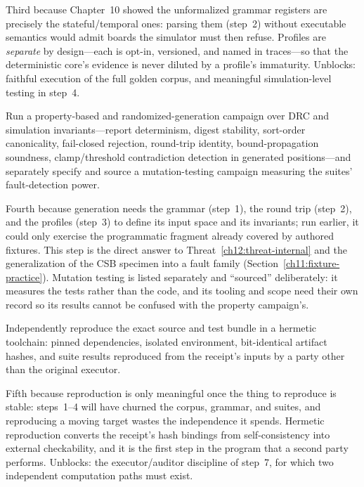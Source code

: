 Third because Chapter~10 showed the unformalized grammar registers are precisely the stateful/temporal ones: parsing them (step~2) without executable semantics would admit boards the simulator must then refuse. Profiles are \emph{separate} by design---each is opt-in, versioned, and named in traces---so that the deterministic core's evidence is never diluted by a profile's immaturity. Unblocks: faithful execution of the full golden corpus, and meaningful simulation-level testing in step~4.

\begin{protocol}\label{ch12:step4}
Run a property-based and randomized-generation campaign \cite{quickcheck} over DRC and simulation invariants---report determinism, digest stability, sort-order canonicality, fail-closed rejection, round-trip identity, bound-propagation soundness, clamp/threshold contradiction detection in generated positions---and separately specify and source a mutation-testing campaign measuring the suites' fault-detection power.
\end{protocol}

Fourth because generation needs the grammar (step~1), the round trip (step~2), and the profiles (step~3) to define its input space and its invariants; run earlier, it could only exercise the programmatic fragment already covered by authored fixtures. This step is the direct answer to Threat~\ref{ch12:threat-internal} and the generalization of the CSB specimen into a fault family (Section~\ref{ch11:fixture-practice}). Mutation testing is listed separately and ``sourced'' deliberately: it measures the tests rather than the code, and its tooling and scope need their own record so its results cannot be confused with the property campaign's.

\begin{protocol}\label{ch12:step5}
Independently reproduce the exact source and test bundle in a hermetic toolchain: pinned dependencies, isolated environment, bit-identical artifact hashes, and suite results reproduced from the receipt's inputs by a party other than the original executor.
\end{protocol}

Fifth because reproduction is only meaningful once the thing to reproduce is stable: steps~1--4 will have churned the corpus, grammar, and suites, and reproducing a moving target wastes the independence it spends. Hermetic reproduction converts the receipt's hash bindings from self-consistency into external checkability, and it is the first step in the program that a second party performs. Unblocks: the executor/auditor discipline of step~7, for which two independent computation paths must exist.

